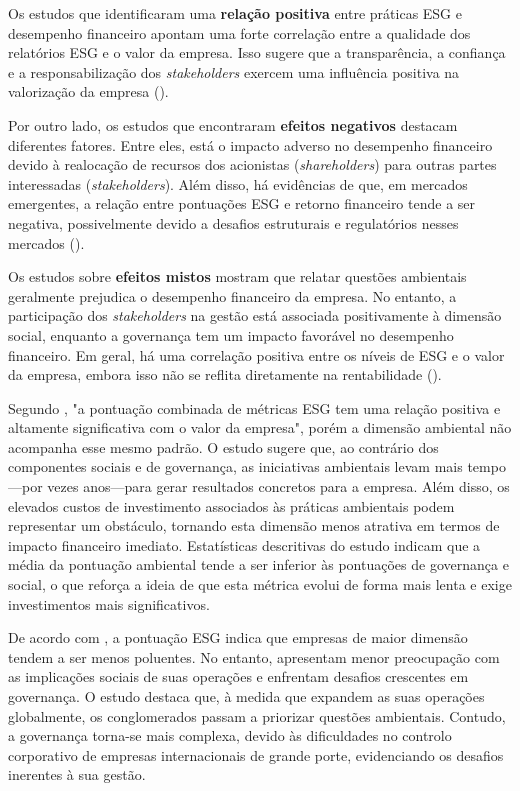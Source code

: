 Os estudos que identificaram uma \textbf{relação positiva} entre práticas ESG e desempenho financeiro apontam uma forte correlação entre a qualidade dos relatórios ESG e o valor da empresa. Isso sugere que a transparência, a confiança e a responsabilização dos \textit{stakeholders} exercem uma influência positiva na valorização da empresa (\cite{Aydomu2022}).

Por outro lado, os estudos que encontraram \textbf{efeitos negativos} destacam diferentes fatores. Entre eles, está o impacto adverso no desempenho financeiro devido à realocação de recursos dos acionistas (\textit{shareholders}) para outras partes interessadas (\textit{stakeholders}). Além disso, há evidências de que, em mercados emergentes, a relação entre pontuações ESG e retorno financeiro tende a ser negativa, possivelmente devido a desafios estruturais e regulatórios nesses mercados (\cite{Aydomu2022}).

Os estudos sobre \textbf{efeitos mistos} mostram que relatar questões ambientais geralmente prejudica o desempenho financeiro da empresa. No entanto, a participação dos \textit{stakeholders} na gestão está associada positivamente à dimensão social, enquanto a governança tem um impacto favorável no desempenho financeiro. Em geral, há uma correlação positiva entre os níveis de ESG e o valor da empresa, embora isso não se reflita diretamente na rentabilidade (\cite{Aydomu2022}).

Segundo \cite{Aydomu2022}, "a pontuação combinada de métricas ESG tem uma relação positiva e altamente significativa com o valor da empresa", porém a dimensão ambiental não acompanha esse mesmo padrão. O estudo sugere que, ao contrário dos componentes sociais e de governança, as iniciativas ambientais levam mais tempo—por vezes anos—para gerar resultados concretos para a empresa. Além disso, os elevados custos de investimento associados às práticas ambientais podem representar um obstáculo, tornando esta dimensão menos atrativa em termos de impacto financeiro imediato. Estatísticas descritivas do estudo indicam que a média da pontuação ambiental tende a ser inferior às pontuações de governança e social, o que reforça a ideia de que esta métrica evolui de forma mais lenta e exige investimentos mais significativos.

De acordo com \cite{Cohen2023}, a pontuação ESG indica que empresas de maior dimensão tendem a ser menos poluentes. No entanto, apresentam menor preocupação com as implicações sociais de suas operações e enfrentam desafios crescentes em governança. O estudo destaca que, à medida que expandem as suas operações globalmente, os conglomerados passam a priorizar questões ambientais. Contudo, a governança torna-se mais complexa, devido às dificuldades no controlo corporativo de empresas internacionais de grande porte, evidenciando os desafios inerentes à sua gestão.

